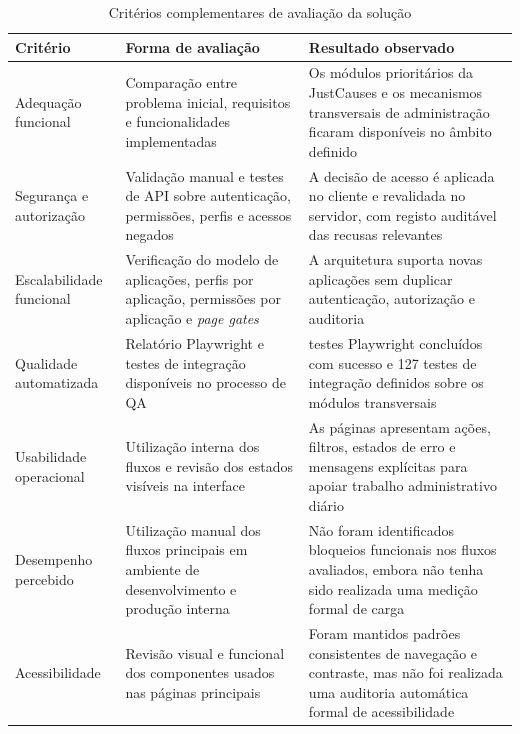 \begin{table}[H]
\caption{Critérios complementares de avaliação da solução}
\label{tab:avaliacao_complementar}
\begin{center}
\begingroup
\scriptsize
\setlength{\tabcolsep}{4pt}
\begin{tabular}{|>{\raggedright\arraybackslash}p{2.4cm}|>{\raggedright\arraybackslash}p{5.2cm}|>{\raggedright\arraybackslash}p{4.5cm}|}
\hline
\textbf{Critério} & \textbf{Forma de avaliação} & \textbf{Resultado observado} \\ \hline
Adequação funcional & Comparação entre problema inicial, requisitos e funcionalidades implementadas & Os módulos prioritários da JustCauses e os mecanismos transversais de administração ficaram disponíveis no âmbito definido \\ \hline
Segurança e autorização & Validação manual e testes de \gls{API} sobre autenticação, permissões, perfis e acessos negados & A decisão de acesso é aplicada no cliente e revalidada no servidor, com registo auditável das recusas relevantes \\ \hline
Escalabilidade funcional & Verificação do modelo de aplicações, perfis por aplicação, permissões por aplicação e \textit{page gates} & A arquitetura suporta novas aplicações sem duplicar autenticação, autorização e auditoria \\ \hline
Qualidade automatizada & Relatório Playwright e testes de integração disponíveis no processo de \gls{QA} & 319 testes Playwright concluídos com sucesso e 127 testes de integração definidos sobre os módulos transversais \\ \hline
Usabilidade operacional & Utilização interna dos fluxos e revisão dos estados visíveis na interface & As páginas apresentam ações, filtros, estados de erro e mensagens explícitas para apoiar trabalho administrativo diário \\ \hline
Desempenho percebido & Utilização manual dos fluxos principais em ambiente de desenvolvimento e produção interna & Não foram identificados bloqueios funcionais nos fluxos avaliados, embora não tenha sido realizada uma medição formal de carga \\ \hline
Acessibilidade & Revisão visual e funcional dos componentes usados nas páginas principais & Foram mantidos padrões consistentes de navegação e contraste, mas não foi realizada uma auditoria automática formal de acessibilidade \\ \hline
\end{tabular}
\endgroup
\end{center}
\end{table}


